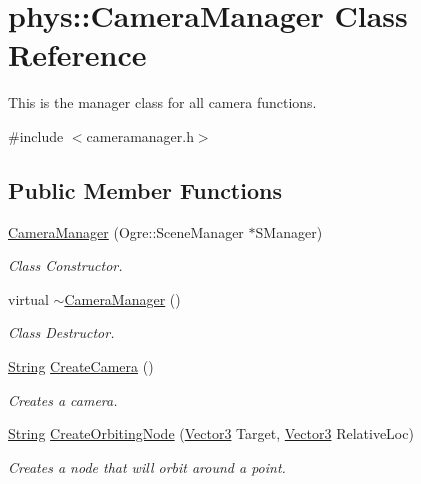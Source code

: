 \hypertarget{classphys_1_1CameraManager}{
\section{phys::CameraManager Class Reference}
\label{d9/d91/classphys_1_1CameraManager}
}


This is the manager class for all camera functions.  




{\ttfamily \#include $<$cameramanager.h$>$}

\subsection*{Public Member Functions}
\begin{DoxyCompactItemize}
\item 
\hyperlink{classphys_1_1CameraManager_aff47d21e0c80b2b1b44148b0ec7de344}{CameraManager} (Ogre::SceneManager $\ast$SManager)
\begin{DoxyCompactList}\small\item\em Class Constructor. \item\end{DoxyCompactList}\item 
virtual \hyperlink{classphys_1_1CameraManager_a0b0f032477309eb47b0302fd5eef198c}{$\sim$CameraManager} ()
\begin{DoxyCompactList}\small\item\em Class Destructor. \item\end{DoxyCompactList}\item 
\hyperlink{namespacephys_aa03900411993de7fbfec4789bc1d392e}{String} \hyperlink{classphys_1_1CameraManager_ac6ff80c91fa5a2cd21ebd8b78db9add2}{CreateCamera} ()
\begin{DoxyCompactList}\small\item\em Creates a camera. \item\end{DoxyCompactList}\item 
\hyperlink{namespacephys_aa03900411993de7fbfec4789bc1d392e}{String} \hyperlink{classphys_1_1CameraManager_a9a696ea09f174a69bbc6d0bb179b3de4}{CreateOrbitingNode} (\hyperlink{classphys_1_1Vector3}{Vector3} Target, \hyperlink{classphys_1_1Vector3}{Vector3} RelativeLoc)
\begin{DoxyCompactList}\small\item\em Creates a node that will orbit around a point. \item\end{DoxyCompactList}\item 

\end{DoxyCompactItemize}
